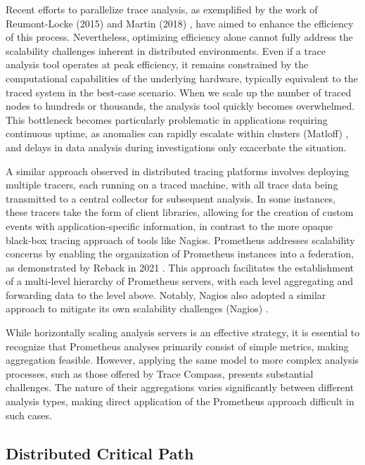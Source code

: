 Recent efforts to parallelize trace analysis, as exemplified by the work of Reumont-Locke (2015) \cite{reumont2015methodes} and Martin (2018) \cite{Martin2018}, have aimed to enhance the efficiency of this process. Nevertheless, optimizing efficiency alone cannot fully address the scalability challenges inherent in distributed environments. Even if a trace analysis tool operates at peak efficiency, it remains constrained by the computational capabilities of the underlying hardware, typically equivalent to the traced system in the best-case scenario. When we scale up the number of traced nodes to hundreds or thousands, the analysis tool quickly becomes overwhelmed. This bottleneck becomes particularly problematic in applications requiring continuous uptime, as anomalies can rapidly escalate within clusters (Matloff) \cite{matloff2011programming}, and delays in data analysis during investigations only exacerbate the situation.

A similar approach observed in distributed tracing platforms involves deploying multiple tracers, each running on a traced machine, with all trace data being transmitted to a central collector for subsequent analysis. In some instances, these tracers take the form of client libraries, allowing for the creation of custom events with application-specific information, in contrast to the more opaque black-box tracing approach of tools like Nagios. Prometheus addresses scalability concerns by enabling the organization of Prometheus instances into a federation, as demonstrated by Reback in 2021 \cite{Logz.io_prometheus_2023}. This approach facilitates the establishment of a multi-level hierarchy of Prometheus servers, with each level aggregating and forwarding data to the level above. Notably, Nagios also adopted a similar approach to mitigate its own scalability challenges (Nagios) \cite{Nagios2019}.

While horizontally scaling analysis servers is an effective strategy, it is essential to recognize that Prometheus analyses primarily consist of simple metrics, making aggregation feasible. However, applying the same model to more complex analysis processes, such as those offered by Trace Compass, presents substantial challenges. The nature of their aggregations varies significantly between different analysis types, making direct application of the Prometheus approach difficult in such cases.

\subsection{Distributed Critical Path}

